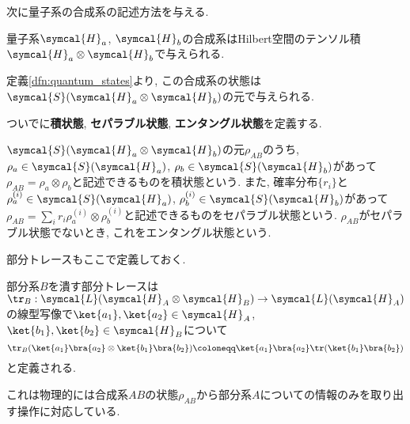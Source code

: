 

次に量子系の合成系の記述方法を与える. 
\begin{mydfn}[合成系]\label{dfn:composite_system}
  量子系$\symcal{H}_a$, $\symcal{H}_b$の合成系はHilbert空間のテンソル積$\symcal{H}_a\otimes\symcal{H}_b$で与えられる. 
\end{mydfn}
定義\ref{dfn:quantum_states}より, この合成系の状態は$\symcal{S}(\symcal{H}_a\otimes\symcal{H}_b)$の元で与えられる. 

ついでに\textbf{積状態}, \textbf{セパラブル状態}, \textbf{エンタングル状態}を定義する. 

\begin{mydfn}
  $\symcal{S}(\symcal{H}_a\otimes\symcal{H}_b)$の元$\rho_{AB}$のうち, $\rho_a\in\symcal{S}(\symcal{H}_a)$, $\rho_b\in\symcal{S}(\symcal{H}_b)$があって$\rho_{AB}=\rho_a\otimes\rho_b$と記述できるものを積状態という. 
  また, 確率分布$\{r_i\}$と$\rho_a^{(i)}\in\symcal{S}(\symcal{H}_a)$, $\rho_b^{(i)}\in\symcal{S}(\symcal{H}_b)$があって$\rho_{AB}=\sum_{i}r_i\rho_a^{(i)}\otimes\rho_b^{(i)}$と記述できるものをセパラブル状態という. 
  $\rho_{AB}$がセパラブル状態でないとき, これをエンタングル状態という. 
\end{mydfn}

部分トレースもここで定義しておく. 
\begin{mydfn}[部分トレース]
  部分系$B$を潰す部分トレースは$\tr_B:\symcal{L}(\symcal{H}_A\otimes \symcal{H}_B)\to \symcal{L}(\symcal{H}_A)$の線型写像で$\ket{a_1}, \ket{a_2}\in\symcal{H}_A$, $\ket{b_1}, \ket{b_2}\in\symcal{H}_B$について
  \begin{equation}
    \tr_B(\ket{a_1}\bra{a_2}\otimes\ket{b_1}\bra{b_2})\coloneqq\ket{a_1}\bra{a_2}\tr(\ket{b_1}\bra{b_2})
  \end{equation}
  と定義される. 
\end{mydfn}
これは物理的には合成系$AB$の状態$\rho_{AB}$から部分系$A$についての情報のみを取り出す操作に対応している. 
